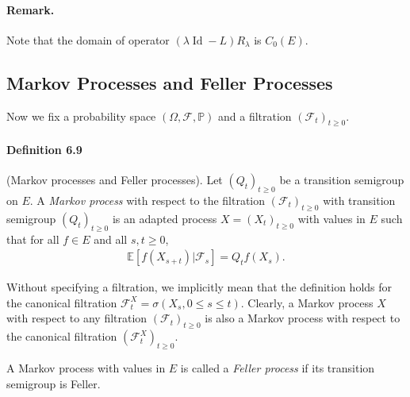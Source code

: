 \documentclass{article}
\numberwithin{equation}{section}
\newcommand{\E}{\mathbb{E}}
\renewcommand{\P}{\mathbb{P}}
\DeclareMathOperator{\id}{Id}
\theoremstyle{plain}
\theoremstyle{definition}
\begin{document}
\paragraph{Remark.} Note that the domain of operator $(\lambda\id-L)R_\lambda$ is $C_0(E)$.

\newpage
\subsection{Markov Processes and Feller Processes}
Now we fix a probability space $(\Omega,\mathscr{F},\P)$ and a filtration $(\mathscr{F}_t)_{t\geq 0}$.

\paragraph{Definition 6.9\label{def:6.9}} (Markov processes and Feller processes). Let $(Q_t)_{t\geq 0}$ be a transition semigroup on $E$. A \textit{Markov process} with respect to the filtration $(\mathscr{F}_t)_{t\geq 0}$ with transition semigroup $(Q_t)_{t\geq 0}$ is an adapted process $X=(X_t)_{t\geq 0}$ with values in $E$ such that for all $f\in E$ and all $s,t\geq 0$,
\begin{align*}
	\E\left[f(X_{s+t})|\mathscr{F}_s\right] = Q_tf(X_s).\tag{6.2}\label{eq:6.2}
\end{align*}

Without specifying a filtration, we implicitly mean that the definition holds for the canonical filtration $\mathscr{F}_t^X=\sigma(X_s,0\leq s\leq t)$. Clearly, a Markov process $X$ with respect to any filtration $(\mathscr{F}_t)_{t\geq 0}$ is also a Markov process with respect to the canonical filtration $(\mathscr{F}_t^X)_{t\geq 0}$.

A Markov process with values in $E$ is called a \textit{Feller process} if its transition semigroup is Feller.
\end{document}
